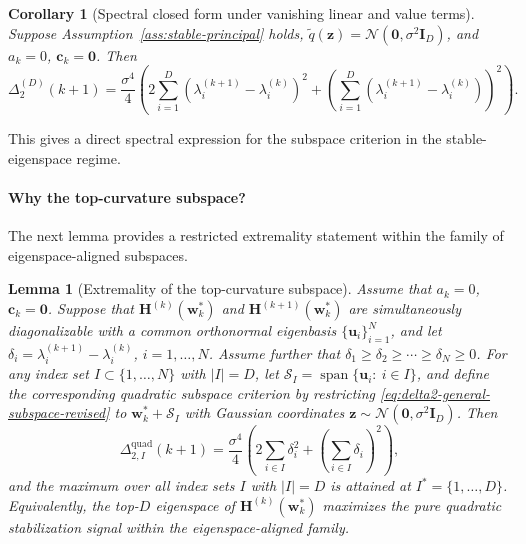 \documentclass[10pt]{article}
\theoremstyle{plain}
\newtheorem{lemma}[theorem]{Lemma}
\newtheorem{corollary}[theorem]{Corollary}
\theoremstyle{remark}
\begin{document}
\begin{corollary}[Spectral closed form under vanishing linear and value terms]
\label{cor:spectral}
Suppose Assumption~\ref{ass:stable-principal} holds, $\tilde q(\mathbf z)=\mathcal N(\mathbf 0,\sigma^2\mathbf I_D)$, and $a_k=0$, $\mathbf c_k=\mathbf 0$.
Then
\begin{equation}
\label{eq:spectral-closed-form}
\Delta_2^{(D)}(k+1)
=
\frac{\sigma^4}{4}
\left(
2\sum_{i=1}^D (\lambda_i^{(k+1)}-\lambda_i^{(k)})^2
+
\left(
\sum_{i=1}^D (\lambda_i^{(k+1)}-\lambda_i^{(k)})
\right)^2
\right).
\end{equation}
\end{corollary}

This gives a direct spectral expression for the subspace criterion in the stable-eigenspace regime.

\paragraph{Why the top-curvature subspace?}
The next lemma provides a restricted extremality statement within the family of eigenspace-aligned subspaces.

\begin{lemma}[Extremality of the top-curvature subspace]
\label{lemma:extremal-topD}
Assume that $a_k=0$, $\mathbf c_k=\mathbf 0$.
Suppose that $\mathbf H^{(k)}(\mathbf w_k^*)$ and $\mathbf H^{(k+1)}(\mathbf w_k^*)$ are simultaneously diagonalizable with a common orthonormal eigenbasis $\{\mathbf u_i\}_{i=1}^N$, and let $\delta_i=\lambda_i^{(k+1)}-\lambda_i^{(k)}$, $i=1,\dots,N$. Assume further that $\delta_1 \ge \delta_2 \ge \cdots \ge \delta_N \ge 0$.
For any index set $I\subset\{1,\dots,N\}$ with $|I|=D$, let $\mathcal S_I=\operatorname{span}\{\mathbf u_i:\ i\in I\}$,
and define the corresponding quadratic subspace criterion by restricting \eqref{eq:delta2-general-subspace-revised} to $\mathbf w_k^*+\mathcal S_I$ with Gaussian coordinates $\mathbf z\sim\mathcal N(\mathbf 0,\sigma^2\mathbf I_D)$.
Then
\begin{equation}
\label{eq:extremal-criterion}
\Delta_{2,I}^{\mathrm{quad}}(k+1)
=
\frac{\sigma^4}{4}
\left(
2\sum_{i\in I}\delta_i^2
+
\left(\sum_{i\in I}\delta_i\right)^2
\right),
\end{equation}
and the maximum over all index sets $I$ with $|I|=D$ is attained at $I^*=\{1,\dots,D\}$.
Equivalently, the top-$D$ eigenspace of $\mathbf H^{(k)}(\mathbf w_k^*)$ maximizes the pure quadratic stabilization signal within the eigenspace-aligned family.
\end{lemma}
\end{document}
